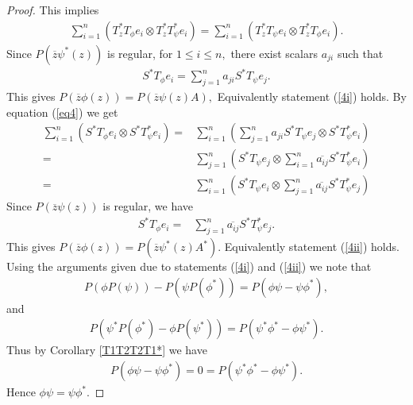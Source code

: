\documentclass[12pt, reqno]{amsart}
\theoremstyle{definition}
\theoremstyle{remark}
\numberwithin{equation}{section}
\begin{document}
\begin{proof}
            This implies
             \begin{align*}  
                \sum_{i=1}^{n} (T_z^*T_\phi e_i \otimes T_z^*T^*_\psi  e_i) = \sum_{i=1}^{n} (T_z^*T_\psi e_i \otimes T_z^*T_\phi e_i).
            \end{align*}
            Since $P(\overline{z}\psi^*(z))$ is regular, for $1\leq i\leq n,$ there exist scalars $a_{ji}$ such that
            \begin{align}
                S^*T_\phi e_i = \sum_{j=1}^{n}a_{ji}S^*T_\psi e_j.\label{eq4}
            \end{align}
            This gives $P(\overline{z}\phi(z))=P(\overline{z}\psi(z)A),$ Equivalently statement (\ref{4i}) holds.
            By equation (\ref{eq4}) we get
            \begin{align*}
            \sum_{i=1}^{n} (S^*T_\phi e_i \otimes S^*T^*_\psi  e_i)=&\sum_{i=1}^{n} (\sum_{j=1}^{n}a_{ji}S^*T_\psi e_j \otimes S^*T^*_\psi  e_i)\\
            =&\sum_{j=1}^{n}(S^*T_\psi e_j \otimes \sum_{i=1}^{n} \overline{a_{ij}}S^*T^*_\psi  e_i)\\
            =&  \sum_{i=1}^{n} (S^*T_\psi e_i \otimes \sum_{j=1}^{n}\overline{a_{ij}}S^*T_\psi^* e_j)
            \end{align*}
            Since $P(\overline{z}\psi(z))$ is regular, we have
            \begin{align*}
                S^*T_\phi e_i=&\sum_{j=1}^{n}\overline{a_{ij}}S^*T_\psi^* e_j.
            \end{align*}
            This gives $P(\overline{z}\phi(z))=P(\overline{z}\psi^*(z)A^*).$ Equivalently statement (\ref{4ii}) holds. Using the arguments given due to statements (\ref{4i}) and (\ref{4ii}) we note that
            \begin{align*}
                P(\phi P(\psi))-P(\psi P(\phi^*))=P(\phi \psi- \psi \phi^*),
            \end{align*}
            and
            \begin{align*}
                P(\psi^*P(\phi^*) - \phi P(\psi^*))=P(\psi^*\phi^* - \phi\psi^*).
            \end{align*}
            Thus by Corollary \ref{T1T2T2T1*} we have
                \begin{align*}
                    P(\phi \psi- \psi \phi^*)=0=P(\psi^*\phi^* - \phi\psi^*).
                \end{align*}
               Hence $\phi \psi= \psi \phi^*.$
            
        \end{proof}
    
\end{document}
